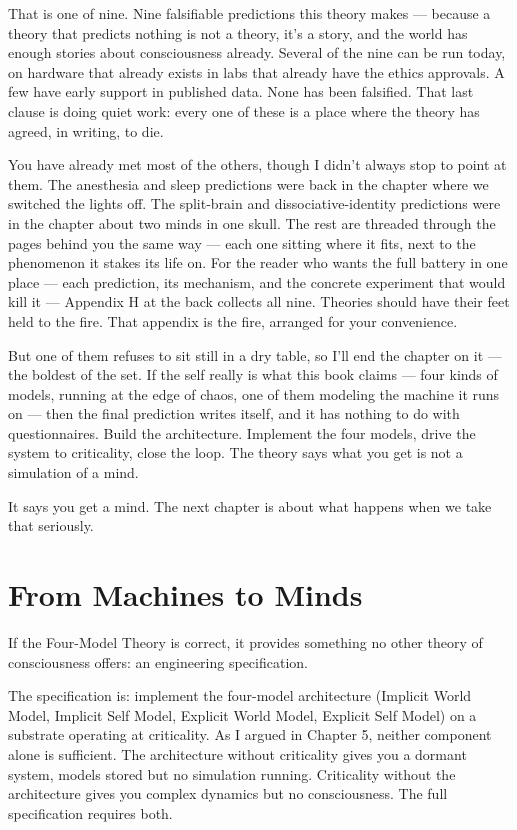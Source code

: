 \documentclass[11pt, twoside, openright]{book}
\begin{document}
That is one of nine. Nine falsifiable predictions this theory makes --- because a theory that predicts nothing is not a theory, it's a story, and the world has enough stories about consciousness already. Several of the nine can be run today, on hardware that already exists in labs that already have the ethics approvals. A few have early support in published data. None has been falsified. That last clause is doing quiet work: every one of these is a place where the theory has agreed, in writing, to die.

You have already met most of the others, though I didn't always stop to point at them. The anesthesia and sleep predictions were back in the chapter where we switched the lights off. The split-brain and dissociative-identity predictions were in the chapter about two minds in one skull. The rest are threaded through the pages behind you the same way --- each one sitting where it fits, next to the phenomenon it stakes its life on. For the reader who wants the full battery in one place --- each prediction, its mechanism, and the concrete experiment that would kill it --- Appendix H at the back collects all nine. Theories should have their feet held to the fire. That appendix is the fire, arranged for your convenience.

But one of them refuses to sit still in a dry table, so I'll end the chapter on it --- the boldest of the set. If the self really is what this book claims --- four kinds of models, running at the edge of chaos, one of them modeling the machine it runs on --- then the final prediction writes itself, and it has nothing to do with questionnaires. Build the architecture. Implement the four models, drive the system to criticality, close the loop. The theory says what you get is not a simulation of a mind.

It says you get a mind. The next chapter is about what happens when we take that seriously.


\chapter{From Machines to Minds}

If the Four-Model Theory is correct, it provides something no other theory of consciousness offers: an engineering specification.

The specification is: implement the four-model architecture (Implicit World Model, Implicit Self Model, Explicit World Model, Explicit Self Model) on a substrate operating at criticality. As I argued in Chapter 5, neither component alone is sufficient. The architecture without criticality gives you a dormant system, models stored but no simulation running. Criticality without the architecture gives you complex dynamics but no consciousness. The full specification requires both.
\end{document}
